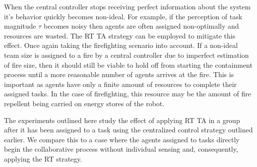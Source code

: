 \documentclass[defaultstyle,12pt]{thesis}
\newcommand{\Sig}{\mathcal{S}}  %
\begin{document}

When the central controller stops receiving perfect information about the system it's behavior quickly becomes non-ideal. For example, if the perception of task magnitude $\tau$ becomes noisy then agents are often assigned non-optimally and resources are wasted. The RT TA strategy can be employed to mitigate this effect. Once again taking the firefighting scenario into account. If a non-ideal team size is assigned to a fire by a central controller due to imperfect estimation of fire size, then it should still be viable to hold off from starting the containment process until a more reasonable number of agents arrives at the fire. This is important as agents have only a finite amount of resources to complete their assigned tasks. In the case of firefighting, this resource may be the amount of fire repellent being carried on energy stores of the robot.

The experiments outlined here study the effect of applying RT TA in a group after it has been assigned to a task using the centralized control strategy outlined earlier. We compare this to a case where the agents assigned to tasks directly begin the collaborative process without individual sensing and, consequently, applying the RT strategy. 

\end{document}
